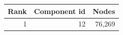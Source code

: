 \begin{tabular}{rrr}
\toprule
Rank & Component id & Nodes \\
\midrule
1 & 12 & 76,269 \\
\bottomrule
\end{tabular}

